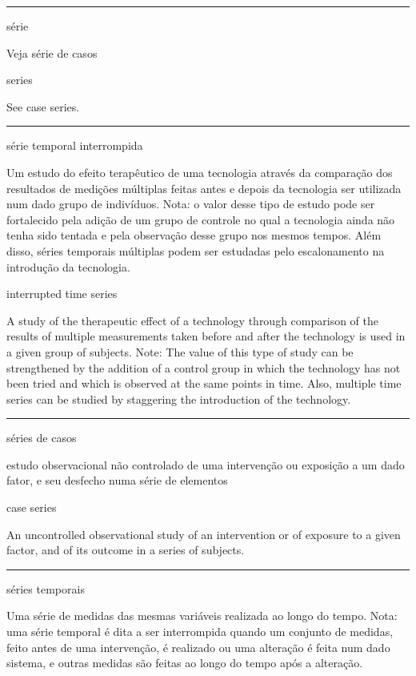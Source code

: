 \documentclass[
  openany]{book}
\begin{document}
\begin{center}\rule{0.5\linewidth}{0.5pt}\end{center}

série

Veja série de casos

series

See case series.

\begin{center}\rule{0.5\linewidth}{0.5pt}\end{center}

série temporal interrompida

Um estudo do efeito terapêutico de uma tecnologia através da comparação dos resultados de medições múltiplas feitas antes e depois da tecnologia ser utilizada num dado grupo de indivíduos. Nota: o valor desse tipo de estudo pode ser fortalecido pela adição de um grupo de controle no qual a tecnologia ainda não tenha sido tentada e pela observação desse grupo nos mesmos tempos. Além disso, séries temporais múltiplas podem ser estudadas pelo escalonamento na introdução da tecnologia.

interrupted time series

A study of the therapeutic effect of a technology through comparison of the results of multiple measurements taken before and after the technology is used in a given group of subjects. Note: The value of this type of study can be strengthened by the addition of a control group in which the technology has not been tried and which is observed at the same points in time. Also, multiple time series can be studied by staggering the introduction of the technology.

\begin{center}\rule{0.5\linewidth}{0.5pt}\end{center}

séries de casos

estudo observacional não controlado de uma intervenção ou exposição a um dado fator, e seu desfecho numa série de elementos

case series

An uncontrolled observational study of an intervention or of exposure to a given factor, and of its outcome in a series of subjects.

\begin{center}\rule{0.5\linewidth}{0.5pt}\end{center}

séries temporais

Uma série de medidas das mesmas variáveis realizada ao longo do tempo. Nota: uma série temporal é dita a ser interrompida quando um conjunto de medidas, feito antes de uma intervenção, é realizado ou uma alteração é feita num dado sistema, e outras medidas são feitas ao longo do tempo após a alteração.
\end{document}
